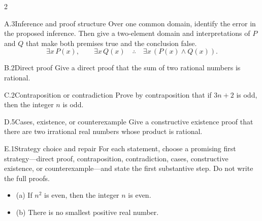 \documentclass[9pt]{extarticle}
\begin{document}
\begin{multicols}{2}
\begin{CoreProblem}{A.3}{Inference and proof structure}
Over one common domain, identify the error in the proposed inference. Then give
a two-element domain and interpretations of $P$ and $Q$ that make both premises
true and the conclusion false.
\[
\exists x\,P(x),\qquad \exists x\,Q(x)
\quad\therefore\quad
\exists x\,(P(x)\land Q(x)).
\]
\end{CoreProblem}
\begin{CoreProblem}{B.2}{Direct proof}
Give a direct proof that the sum of two rational numbers is rational.
\end{CoreProblem}
\begin{CoreProblem}{C.2}{Contraposition or contradiction}
Prove by contraposition that if $3n+2$ is odd, then the integer $n$ is odd.
\end{CoreProblem}
\columnbreak
\begin{CoreProblem}{D.5}{Cases, existence, or counterexample}
Give a constructive existence proof that there are two irrational real numbers
whose product is rational.
\end{CoreProblem}
\begin{CoreProblem}{E.1}{Strategy choice and repair}
For each statement, choose a promising first strategy---direct proof,
contraposition, contradiction, cases, constructive existence, or
counterexample---and state the first substantive step. Do not write the full
proofs.
\begin{itemize}
  \item (a) If $n^2$ is even, then the integer $n$ is even.
  \item (b) There is no smallest positive real number.
\end{itemize}
\end{CoreProblem}
\end{multicols}
\CoreWorkArea
\FormBreak
{}
\end{document}
